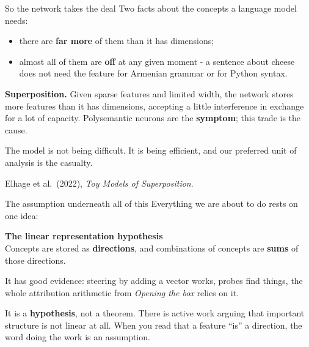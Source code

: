 \documentclass[aspectratio=169]{beamer}
\newcommand{\keybox}[1]{%
  \begin{tcolorbox}[colback=armblue!8, colframe=armblue, boxrule=0.6pt, arc=2pt]
  #1
  \end{tcolorbox}}
\newcommand{\takebox}[1]{%
  \begin{tcolorbox}[colback=paramgreen!8, colframe=paramgreen, boxrule=0.6pt, arc=2pt]
  #1
  \end{tcolorbox}}
\newcommand{\watchbox}[1]{%
  \begin{tcolorbox}[colback=armorange!12, colframe=armorange, boxrule=0.6pt, arc=2pt]
  #1
  \end{tcolorbox}}
\begin{document}
\begin{frame}{So the network takes the deal}
  \vspace{0.7em}
  Two facts about the concepts a language model needs:

  \vspace{0.5em}
  \begin{itemize}
    \item there are \textbf{far more} of them than it has dimensions;
    \item almost all of them are \textbf{off} at any given moment - a sentence about cheese does
      not need the feature for Armenian grammar or for Python syntax.
  \end{itemize}

  \vspace{0.6em}
  \keybox{\small \textbf{Superposition.} Given sparse features and limited width, the network
  stores more features than it has dimensions, accepting a little interference in exchange for a
  lot of capacity. Polysemantic neurons are the \textbf{symptom}; this trade is the cause.}

  \vspace{0.4em}
  \takebox{\small The model is not being difficult. It is being efficient, and our preferred unit
  of analysis is the casualty.}

  \vspace{0.2em}
  {\footnotesize Elhage et al.\ (2022), \emph{Toy Models of Superposition}.}
\end{frame}

\begin{frame}{The assumption underneath all of this}
  \vspace{0.9em}
  Everything we are about to do rests on one idea:

  \vspace{0.7em}
  \begin{center}
  \begin{tcolorbox}[colback=armblue!8, colframe=armblue, boxrule=0.8pt, arc=3pt,
                    width=0.88\textwidth]
    \centering\large
    \textbf{The linear representation hypothesis}\\[0.5em]
    Concepts are stored as \textbf{directions}, and combinations of concepts are
    \textbf{sums} of those directions.
  \end{tcolorbox}
  \end{center}

  \vspace{0.9em}
  It has good evidence: steering by adding a vector works, probes find things, the whole
  attribution arithmetic from \emph{Opening the box} relies on it.

  \vspace{0.8em}
  \watchbox{It is a \textbf{hypothesis}, not a theorem. There is active work arguing that
  important structure is not linear at all. When you read that a feature ``is'' a direction, the
  word doing the work is an assumption.}
\end{frame}
\end{document}
